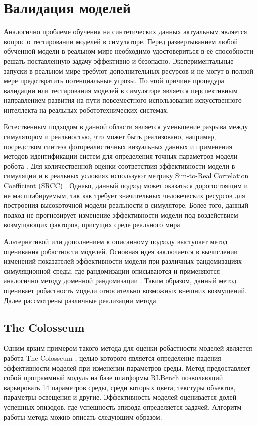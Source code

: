     \section{Валидация моделей}
    
    Аналогично проблеме обучения на синтетических данных актуальным является вопрос о тестировании моделей в симуляторе. Перед развертыванием любой обученной модели в реальном мире необходимо удостовериться в её способности решать поставленную задачу эффективно и безопасно. Экспериментальные запуски в реальном мире требуют дополнительных ресурсов и не могут в полной мере предотвратить потенциальные угрозы. По этой причине процедура валидации или тестирования моделей в симуляторе является перспективным направлением развития на пути повсеместного использования искусственного интеллекта на реальных робототехнических системах. 

    Естественным подходом в данной области является уменьшение разрыва между симулятором и реальностью, что может быть реализовано, например, посредством синтеза фотореалистичных визуальных данных и применения методов идентификации систем для определения точных параметров модели робота \cite{li24simpler}. Для количественной оценки соответствия эффективности модели в симуляции и в реальных условиях используют метрику Sim-to-Real Correlation Coefficient (SRCC) \cite{kadian2020sim2real}. Однако, данный подход может оказаться дорогостоящим и не масштабируемым, так как требует значительных человеческих ресурсов для построения высокоточной модели реальности в симуляторе. Более того, данный подход не прогнозирует изменение эффективности модели под воздействием возмущающих факторов, присущих среде реального мира.

    Альтернативой или дополнением к описанному подходу выступает метод оценивания робастности моделей. Основная идея заключается в вычислении изменений показателей эффективности модели при различных рандомизациях симуляционной среды, где рандомизации описываются и применяются аналогично методу доменной рандомизации \cite{pumacay2024colosseum, li24simpler}. Таким образом, данный метод оценивает робастность модели относительно возможных внешних возмущений. Далее рассмотрены различные реализации метода.

        \subsection{The Colosseum}
    
        Одним ярким примером такого метода для оценки робастности моделей является работа The Colosseum \cite{pumacay2024colosseum}, целью которого является определение падения эффективности моделей при изменении параметров среды. Метод предоставляет собой программный модуль на базе платформы RLBench \cite{james2020rlbench} позволяющий варьировать 14 параметров среды, среди которых цвета, текстуры объектов, параметры освещения и другие. Эффективность моделей оценивается долей успешных эпизодов, где успешность эпизода определяется задачей. Алгоритм работы метода можно описать следующим образом:
    
